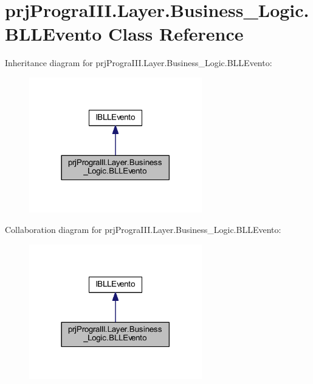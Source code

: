 \hypertarget{classprj_progra_i_i_i_1_1_layer_1_1_business___logic_1_1_b_l_l_evento}{}\section{prj\+Progra\+I\+I\+I.\+Layer.\+Business\+\_\+\+Logic.\+B\+L\+L\+Evento Class Reference}
\label{classprj_progra_i_i_i_1_1_layer_1_1_business___logic_1_1_b_l_l_evento}


Inheritance diagram for prj\+Progra\+I\+I\+I.\+Layer.\+Business\+\_\+\+Logic.\+B\+L\+L\+Evento\+:
\nopagebreak
\begin{figure}[H]
\begin{center}
\leavevmode
\includegraphics[width=213pt]{classprj_progra_i_i_i_1_1_layer_1_1_business___logic_1_1_b_l_l_evento__inherit__graph}
\end{center}
\end{figure}


Collaboration diagram for prj\+Progra\+I\+I\+I.\+Layer.\+Business\+\_\+\+Logic.\+B\+L\+L\+Evento\+:
\nopagebreak
\begin{figure}[H]
\begin{center}
\leavevmode
\includegraphics[width=213pt]{classprj_progra_i_i_i_1_1_layer_1_1_business___logic_1_1_b_l_l_evento__coll__graph}
\end{center}
\end{figure}

